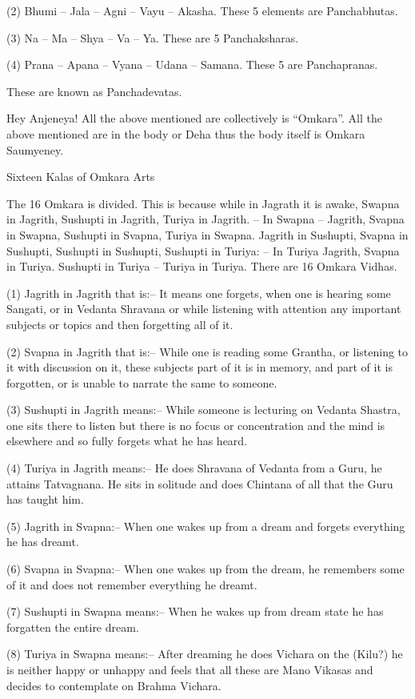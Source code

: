 (2) Bhumi – Jala – Agni – Vayu – Akasha. These 5 elements are Panchabhutas.

(3) Na – Ma – Shya – Va – Ya. These are 5 Panchaksharas.

(4) Prana – Apana – Vyana – Udana – Samana. These 5 are Panchapranas.

These are known as Panchadevatas.

Hey Anjeneya! All the above mentioned are collectively is “Omkara”. All the above mentioned are in the body or Deha thus the body itself is Omkara Saumyeney.

Sixteen Kalas of Omkara Arts

The 16 Omkara is divided. This is because while in Jagrath it is awake, Swapna in Jagrith, Sushupti in Jagrith, Turiya in Jagrith. – In Swapna – Jagrith, Svapna in Swapna, Sushupti in Svapna, Turiya in Swapna. Jagrith in Sushupti, Svapna in Sushupti, Sushupti in Sushupti, Sushupti in Turiya: – In Turiya Jagrith, Svapna in Turiya. Sushupti in Turiya – Turiya in Turiya. There are 16 Omkara Vidhas.

(1) Jagrith in Jagrith that is:– It means one forgets, when one is hearing some Sangati, or in Vedanta Shravana or while listening with attention any important subjects or topics and then forgetting all of it.

(2) Svapna in Jagrith that is:– While one is reading some Grantha, or listening to it with discussion on it, these subjects part of it is in memory, and part of it is forgotten, or is unable to narrate the same to someone.

(3) Sushupti in Jagrith means:– While someone is lecturing on Vedanta Shastra, one sits there to listen but there is no focus or concentration and the mind is elsewhere and so fully forgets what he has heard.

(4) Turiya in Jagrith means:– He does Shravana of Vedanta from a Guru, he attains Tatvagnana. He sits in solitude and does Chintana of all that the Guru has taught him.

(5) Jagrith in Svapna:– When one wakes up from a dream and forgets everything he has dreamt.

(6) Svapna in Svapna:– When one wakes up from the dream, he remembers some of it and does not remember everything he dreamt.

(7) Sushupti in Swapna means:– When he wakes up from dream state he has forgatten the entire dream.

(8) Turiya in Swapna means:– After dreaming he does Vichara on the (Kilu?) he is neither happy or unhappy and feels that all these are Mano Vikasas and decides to contemplate on Brahma Vichara.

